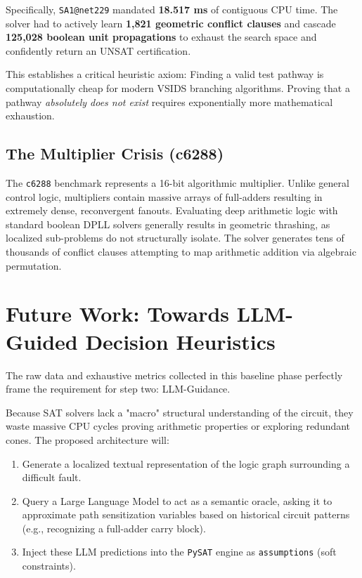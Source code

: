 \documentclass[11pt,a4paper]{article}
\begin{document}
Specifically, \texttt{SA1@net229} mandated \textbf{18.517 ms} of contiguous CPU time. The solver had to actively learn \textbf{1,821 geometric conflict clauses} and cascade \textbf{125,028 boolean unit propagations} to exhaust the search space and confidently return an UNSAT certification. 

This establishes a critical heuristic axiom: Finding a valid test pathway is computationally cheap for modern VSIDS branching algorithms. Proving that a pathway \textit{absolutely does not exist} requires exponentially more mathematical exhaustion.

\subsection{The Multiplier Crisis (c6288)}
The \texttt{c6288} benchmark represents a 16-bit algorithmic multiplier. Unlike general control logic, multipliers contain massive arrays of full-adders resulting in extremely dense, reconvergent fanouts. Evaluating deep arithmetic logic with standard boolean DPLL solvers generally results in geometric thrashing, as localized sub-problems do not structurally isolate. The solver generates tens of thousands of conflict clauses attempting to map arithmetic addition via algebraic permutation.

\section{Future Work: Towards LLM-Guided Decision Heuristics}
The raw data and exhaustive metrics collected in this baseline phase perfectly frame the requirement for step two: LLM-Guidance.

Because SAT solvers lack a "macro" structural understanding of the circuit, they waste massive CPU cycles proving arithmetic properties or exploring redundant cones. 
The proposed architecture will:
\begin{enumerate}
    \item Generate a localized textual representation of the logic graph surrounding a difficult fault.
    \item Query a Large Language Model to act as a semantic oracle, asking it to approximate path sensitization variables based on historical circuit patterns (e.g., recognizing a full-adder carry block).
    \item Inject these LLM predictions into the \texttt{PySAT} engine as \texttt{assumptions} (soft constraints).
\end{enumerate}
\end{document}
